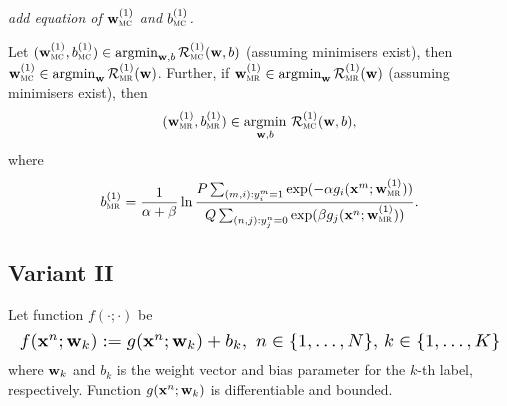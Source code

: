 \TODO
{\it add equation of $\mathbf{w}_\textsc{mc}^{({1})}$ and $b_\textsc{mc}^{({1})}$.}


\begin{theorem}
Let $(\mathbf{w}_\textsc{mc}^{({1})}, b_\textsc{mc}^{({1})}) \in \operatorname*{argmin}_{\mathbf{w}, b} \mathcal{R}_\textsc{mc}^{({1})}(\mathbf{w}, b)$ (assuming minimisers exist),
then $\mathbf{w}_\textsc{mc}^{({1})} \in \operatorname*{argmin}_{\mathbf{w}} \mathcal{R}_\textsc{mr}^{({1})}(\mathbf{w})$.
Further, if $\mathbf{w}_\textsc{mr}^{({1})} \in \operatorname*{argmin}_{\mathbf{w}} \mathcal{R}_\textsc{mr}^{({1})}(\mathbf{w})$ (assuming minimisers exist),
then 
$$
(\mathbf{w}_\textsc{mr}^{({1})}, b_\textsc{mr}^{({1})}) \in \operatorname*{argmin}_{\mathbf{w},b} \, \mathcal{R}_\textsc{mc}^{({1})}(\mathbf{w}, b),
$$ 
where
$$
b_\textsc{mr}^{({1})} = \frac{1}{\alpha + \beta} \ln 
      \frac{P \sum_{(m,i): y_i^m = 1} \exp(-\alpha g_i(\mathbf{x}^m; \mathbf{w}_\textsc{mr}^{({1})}))}
           {Q \sum_{(n,j): y_j^n = 0} \exp( \beta  g_j(\mathbf{x}^n; \mathbf{w}_\textsc{mr}^{({1})}))}.
$$
\end{theorem}



\subsection{Variant II}

Let function $f(\cdot; \cdot)$ be
\begin{equation*}
\resizebox{\linewidth}{!}{$
f(\x^n; \w_k) := g(\x^n; \w_k) + b_k, \ n \in \{1,\dots,N\}, \, k \in \{1,\dots,K\}
$}
\end{equation*}
where $\mathbf{w}_k$ and $b_k$ is the weight vector and bias parameter for the $k$-th label, respectively.
Function $g(\mathbf{x}^n; \mathbf{w}_k)$ is differentiable and bounded.


